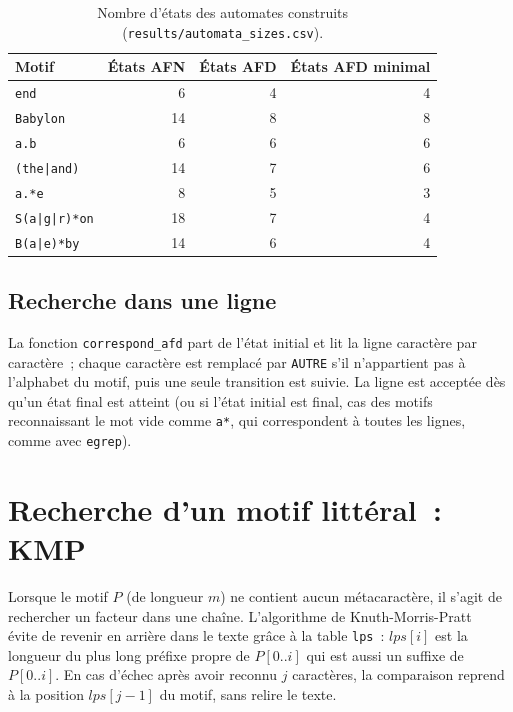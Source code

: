 \documentclass[11pt,a4paper]{article}
\begin{document}
\begin{table}[ht]
\centering
\begin{tabular}{lrrr}
\toprule
\textbf{Motif} & \textbf{États AFN} & \textbf{États AFD} & \textbf{États AFD minimal} \\
\midrule
\texttt{end}          & 6  & 4 & 4 \\
\texttt{Babylon}      & 14 & 8 & 8 \\
\texttt{a.b}          & 6  & 6 & 6 \\
\texttt{(the|and)}    & 14 & 7 & 6 \\
\texttt{a.*e}         & 8  & 5 & 3 \\
\texttt{S(a|g|r)*on}  & 18 & 7 & 4 \\
\texttt{B(a|e)*by}    & 14 & 6 & 4 \\
\bottomrule
\end{tabular}
\caption{Nombre d'états des automates construits
(\texttt{results/automata\_sizes.csv}).}
\label{tab:tailles}
\end{table}

\subsection{Recherche dans une ligne}

La fonction \texttt{correspond\_afd} part de l'état initial et lit la ligne
caractère par caractère~; chaque caractère est remplacé par \texttt{AUTRE}
s'il n'appartient pas à l'alphabet du motif, puis une seule transition est
suivie. La ligne est acceptée dès qu'un état final est atteint (ou si l'état
initial est final, cas des motifs reconnaissant le mot vide comme
\texttt{a*}, qui correspondent à toutes les lignes, comme avec \texttt{egrep}).

\section{Recherche d'un motif littéral~: KMP}
\label{sec:kmp}

Lorsque le motif $P$ (de longueur $m$) ne contient aucun métacaractère, il
s'agit de rechercher un facteur dans une chaîne. L'algorithme de
Knuth-Morris-Pratt~\cite{KnuthMorrisPratt1977} évite de revenir en arrière
dans le texte grâce à la table \texttt{lps}~: $\mathit{lps}[i]$ est la
longueur du plus long préfixe propre de $P[0..i]$ qui est aussi un suffixe de
$P[0..i]$. En cas d'échec après avoir reconnu $j$ caractères, la comparaison
reprend à la position $\mathit{lps}[j-1]$ du motif, sans relire le texte.
\end{document}
